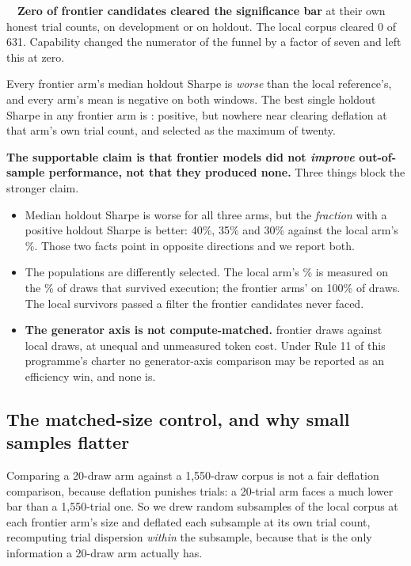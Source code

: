 \documentclass[11pt,a4paper]{article}
\begin{document}
\begin{finding}
\tagfrontier\ \ \textbf{Zero of \aaGvTotal{} frontier candidates cleared the significance bar} at
their own honest trial counts, on development or on holdout. The local corpus cleared 0 of 631.
Capability changed the numerator of the funnel by a factor of seven and left this at zero.
\end{finding}

Every frontier arm's median holdout Sharpe is \emph{worse} than the local reference's, and every
arm's mean is negative on both windows. The best single holdout Sharpe in any frontier arm is
\aaGvClaudeHoldBest{}: positive, but nowhere near clearing deflation at that arm's own trial
count, and selected as the maximum of twenty.

\begin{scopebox}
\textbf{The supportable claim is that frontier models did not \emph{improve} out-of-sample
performance, not that they produced none.} Three things block the stronger claim.
\begin{itemize}
\item Median holdout Sharpe is worse for all three arms, but the \emph{fraction} with a positive
  holdout Sharpe is better: 40\%, 35\% and 30\% against the local arm's \pgmPlainHoldPos\%.
  Those two facts point in opposite directions and we report both.
\item The populations are differently selected. The local arm's \pgmPlainHoldPos\% is measured on
  the \pgmLocalTrade\% of draws that survived execution; the frontier arms' on 100\% of draws.
  The local survivors passed a filter the frontier candidates never faced.
\item \textbf{The generator axis is not compute-matched.} \aaGvNLarge{} frontier draws against
  \pgmPlainDraws{} local draws, at unequal and unmeasured token cost. Under Rule 11 of this
  programme's charter no generator-axis comparison may be reported as an efficiency win, and none
  is.
\end{itemize}
\end{scopebox}

\subsection{The matched-size control, and why small samples flatter}

Comparing a 20-draw arm against a 1{,}550-draw corpus is not a fair deflation comparison, because
deflation punishes trials: a 20-trial arm faces a much lower bar than a 1{,}550-trial one. So we
drew \aaGvSubsamples{} random subsamples of the local corpus at each frontier arm's size and
deflated each subsample at its own trial count, recomputing trial dispersion \emph{within} the
subsample, because that is the only information a 20-draw arm actually has.
\end{document}
